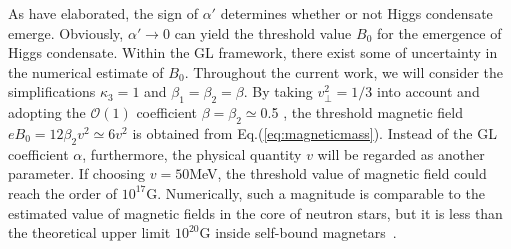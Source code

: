 \documentclass[12pt]{article}
\begin{document}
% 
As have elaborated, the sign of $\alpha'$ determines whether or not Higgs condensate emerge.
Obviously, $\alpha' \rightarrow 0$ can yield the threshold value $B_0$ for the emergence of Higgs condensate. 
Within the GL framework, there exist some of uncertainty in the numerical estimate of $B_0$.
Throughout the current work, we will consider the simplifications 
$\kappa_3=1$ and $\beta_1=\beta_2=\beta$. 
By taking $v_\perp^2=1/3$ into account and adopting the $\mathscr{O}(1)$ coefficient $\beta=\beta_2\simeq${0.5} \cite{balachandran2006semisuperfluid}, the threshold magnetic field $eB_0 = 12\beta_2 v^2 \simeq 6v^2$ is obtained from Eq.(\ref{eq:magneticmass}). Instead of the GL coefficient $\alpha$, furthermore, the physical quantity $v$ will be regarded as another parameter.
If choosing $v = 50$MeV, the threshold value of magnetic field could reach the
order of $10^{17}\text{G}$. Numerically, such a magnitude is comparable to the estimated value of
magnetic fields in the core of neutron stars, but it is less than the theoretical upper
limit $10^{20}\text{G}$ inside self-bound magnetars~\cite{dong2001,lai1991cold}.
\end{document}
